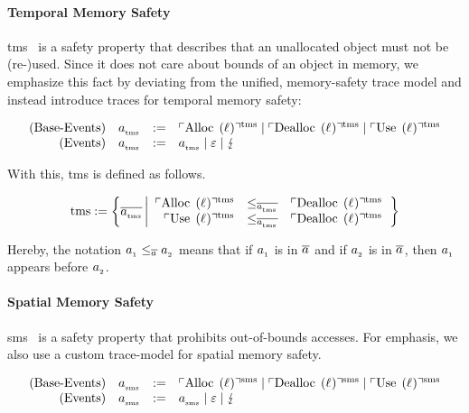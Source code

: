 \documentclass[a4paper,12pt]{article}
\begin{document}
\paragraph{Temporal Memory Safety}

\gls*{tms}~\cite{nagarakatte2010cets} is a safety property that describes that an unallocated object must not be (re-)used.
Since it does not care about bounds of an object in memory, we emphasize this fact by deviating from the unified, memory-safety trace model and instead introduce traces for temporal memory safety:
\begin{definition}{}
\[
  \begin{array}{rcll}
    \text{(Base-Events)}&\tmsEvent &:=& \tmsAlloc \mid \tmsDealloc \mid \tmsUse \\
    \text{(Events)}&\tmsEvent &:=& \tmsEvent \mid \emptyevent \mid \lightning \\ 
  \end{array}
\]
\end{definition}

With this, \gls*{tms} is defined as follows.
\begin{definition}{}
  \[
  \tmssafe:=\left\{\tmsTrace
    \left| 
      \begin{array}{rcl}
        \tmsAlloc&\le_{\tmsTrace}&\tmsDealloc \\
        \tmsUse&\le_{\tmsTrace}&\tmsDealloc \\
      \end{array}
    \right.
  \right\}
  \]
\end{definition}
Hereby, the notation $\varEvent[_{1}]\le_{\varTrace}\varEvent[_{2}]$ means that if $\varEvent[_{1}]$ is in $\varTrace$ and if $\varEvent[_{2}]$ is in $\varTrace$, then $\varEvent[_{1}]$ appears before $\varEvent[_{2}]$.

\paragraph{Spatial Memory Safety}
\gls*{sms}~\cite{nagarakatte2009soft} is a safety property that prohibits out-of-bounds accesses.
For emphasis, we also use a custom trace-model for spatial memory safety.
\begin{definition}{}
\[
  \begin{array}{rcll}
    \text{(Base-Events)}&\smsEvent &:=& \smsAlloc \mid \smsDealloc \mid \smsUse \\
    \text{(Events)}&\smsEvent &:=& \smsEvent \mid \emptyevent \mid \lightning \\ 
  \end{array}
\]
\end{definition}
\end{document}
